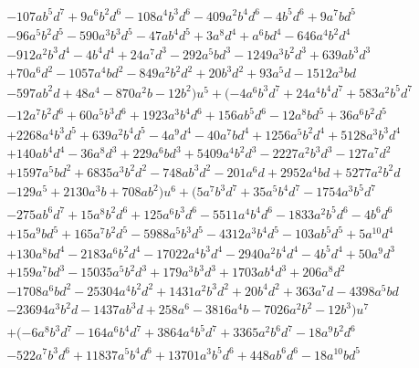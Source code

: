 \documentclass[microtype]{gtpart}     %
\theoremstyle{remark}
\theoremstyle{definition}
\begin{document}
\begin{equation*}
\begin{split}
\qquad& - 107 a b^5 d^7 + 9 a^6 b^2 d^6 - 108 a^4 b^3 d^6 - 409 a^2 b^4 d^6 - 4 b^5 d^6 + 9 a^7 b d^5 \\
      & - 96 a^5 b^2 d^5 - 590 a^3 b^3 d^5 - 47 a b^4 d^5 + 3 a^8 d^4 + a^6 b d^4 - 646 a^4 b^2 d^4 \\
      & - 912 a^2 b^3 d^4 - 4 b^4 d^4 + 24 a^7 d^3 - 292 a^5 b d^3 - 1249 a^3 b^2 d^3 + 639 a b^3 d^3 \\
      & + 70 a^6 d^2 - 1057 a^4 b d^2 - 849 a^2 b^2 d^2 + 20 b^3 d^2 + 93 a^5 d - 1512 a^3 b d \\
      & - 597 a b^2 d + 48 a^4 - 870 a^2 b - 12 b^2) u^5 + (-4 a^6 b^3 d^7 + 24 a^4 b^4 d^7 + 583 a^2 b^5 d^7 \\
      & - 12 a^7 b^2 d^6 + 60 a^5 b^3 d^6 + 1923 a^3 b^4 d^6 + 156 a b^5 d^6 - 12 a^8 b d^5 + 36 a^6 b^2 d^5 \\
      & + 2268 a^4 b^3 d^5 + 639 a^2 b^4 d^5 - 4 a^9 d^4 - 40 a^7 b d^4 + 1256 a^5 b^2 d^4 + 5128 a^3 b^3 d^4 \\
      & + 140 a b^4 d^4 - 36 a^8 d^3 + 229 a^6 b d^3 + 5409 a^4 b^2 d^3 - 2227 a^2 b^3 d^3 - 127 a^7 d^2 \\
      & + 1597 a^5 b d^2 + 6835 a^3 b^2 d^2 - 748 a b^3 d^2 - 201 a^6 d + 2952 a^4 b d + 5277 a^2 b^2 d \\
      & - 129 a^5 + 2130 a^3 b + 708 a b^2) u^6 + (5 a^7 b^3 d^7 + 35 a^5 b^4 d^7 - 1754 a^3 b^5 d^7 \\
      & - 275 a b^6 d^7 + 15 a^8 b^2 d^6 + 125 a^6 b^3 d^6 - 5511 a^4 b^4 d^6 - 1833 a^2 b^5 d^6 - 4 b^6 d^6 \\
      & + 15 a^9 b d^5 + 165 a^7 b^2 d^5 - 5988 a^5 b^3 d^5 - 4312 a^3 b^4 d^5 - 103 a b^5 d^5 + 5 a^{10} d^4 \\
      & + 130 a^8 b d^4 - 2183 a^6 b^2 d^4 - 17022 a^4 b^3 d^4 - 2940 a^2 b^4 d^4 - 4 b^5 d^4 + 50 a^9 d^3 \\
      & + 159 a^7 b d^3 - 15035 a^5 b^2 d^3 + 179 a^3 b^3 d^3 + 1703 a b^4 d^3 + 206 a^8 d^2 \\
      & - 1708 a^6 b d^2 - 25304 a^4 b^2 d^2 + 1431 a^2 b^3 d^2 + 20 b^4 d^2 + 363 a^7 d - 4398 a^5 b d \\
      & - 23694 a^3 b^2 d - 1437 a b^3 d + 258 a^6 - 3816 a^4 b - 7026 a^2 b^2 - 12 b^3) u^7 \\
      & + (-6 a^8 b^3 d^7 - 164 a^6 b^4 d^7 + 3864 a^4 b^5 d^7 + 3365 a^2 b^6 d^7 - 18 a^9 b^2 d^6 \\
      & - 522 a^7 b^3 d^6 + 11837 a^5 b^4 d^6 + 13701 a^3 b^5 d^6 + 448 a b^6 d^6 - 18 a^{10} b d^5 \\

\end{split}
\end{equation*}
\end{document}
